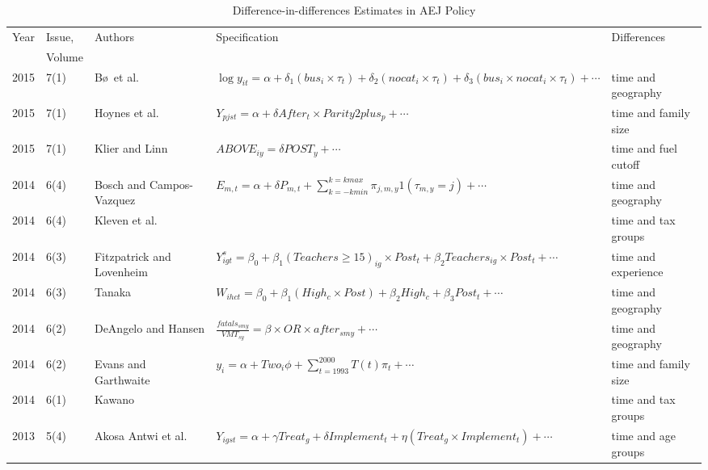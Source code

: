 \begin{landscape}
\begin{table}
\begin{center}
\caption{Difference-in-differences Estimates in AEJ Policy}
\label{Stab:AEJ}
\begin{tabular}{lllll}\toprule
Year & Issue, & Authors & Specification & Differences\\
& Volume & & \\ \midrule
2015 & 7(1) & B\o\ et al. & $\log y_{it}=\alpha + \delta_1(bus_i\times
\tau_t)+\delta_2(nocat_i\times\tau_t)+\delta_3(bus_i\times
nocat_i\times\tau_t)+\cdots$ 
& time and geography \\

2015 & 7(1) & Hoynes et al. & $Y_{pjst} = \alpha + \delta
After_t\times Parity2plus_p + \cdots$  & time and family size \\

2015 & 7(1) & Klier and Linn & $ABOVE_{iy}=\delta POST_y + \cdots$ & time and fuel cutoff\\

2014 & 6(4) & Bosch and Campos-Vazquez & $E_{m,t}=\alpha+\delta
P_{m,t}+\sum_{k=-k min}^{k=k max}\pi_{j,m,y}1(\tau_{m,y}=j)+\cdots$ &
time and geography \\

2014 & 6(4) &Kleven et al. &  & time and tax groups\\

2014 & 6(3) & Fitzpatrick and Lovenheim &
$Y^s_{igt}=\beta_0+\beta_1(Teachers\geq 15)_{ig}\times Post_t +
\beta_2 Teachers_{ig}\times Post_t+\cdots$ & time and experience \\

2014 & 6(3) & Tanaka & $W_{ihct}=\beta_0+\beta_1(High_c\times Post) +
\beta_2 High_c+\beta_3 Post_t + \cdots$ & time and geography \\

2014 & 6(2) & DeAngelo and Hansen &
$\frac{fatals_{smy}}{VMT_{sy}}=\beta\times OR \times
after_{smy}+\cdots$ & time and geography \\

2014 & 6(2) & Evans and Garthwaite &
$y_i=\alpha+Two_i\phi+\sum_{t=1993}^{2000}T(t)\pi_t+\cdots$  & time and family size\\

2014 & 6(1) & Kawano & & time and tax groups \\

2013 & 5(4) & Akosa Antwi et al. & $Y_{igst}=\alpha+\gamma Treat_g +
\delta Implement_t + \eta (Treat_g\times Implement_t)+\cdots$  & time and age groups \\


\end{tabular}
\end{center}
\end{table}
\end{landscape}
